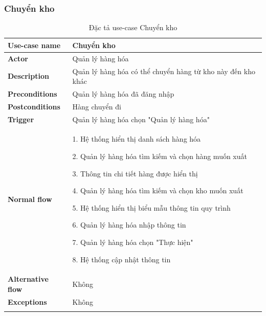 \subsubsection{Chuyển kho}
{
    \setlength\extrarowheight{6pt}
    \begin{longtable}{| p{} | p{} |}
        \hline
        \textbf{Use-case name}
         &
        Chuyển kho
        \\
        \hline
        \textbf{Actor}
         &
        Quản lý hàng hóa
        \\
        \hline
        \textbf{Description}
         &
        Quản lý hàng hóa có thể chuyển hàng từ kho này đến kho khác
        \\
        \hline
        \textbf{Preconditions}
         &
        Quản lý hàng hóa đã đăng nhập
        \\
        \hline
        \textbf{Postconditions}
         &
        Hàng chuyển đi
        \\
        \hline
        \textbf{Trigger}
         &
        Quản lý hàng hóa chọn "Quản lý hàng hóa"
        \\
        \hline
        \begin{flushleft}
            \textbf{Normal flow}
        \end{flushleft}
         &
        1. Hệ thống hiển thị danh sách hàng hóa

        2. Quản lý hàng hóa tìm kiếm và chọn hàng muốn xuất

        3. Thông tin chi tiết hàng được hiển thị

        4. Quản lý hàng hóa tìm kiếm và chọn kho muốn xuất

        5. Hệ thống hiển thị biểu mẫu thông tin quy trình

        6. Quản lý hàng hóa nhập thông tin

        7. Quản lý hàng hóa chọn "Thực hiện"

        8. Hệ thống cập nhật thông tin
        \\
        \hline
        \textbf{Alternative flow}
         &
        Không
        \\
        \hline
        \textbf{Exceptions}
         &
        Không
        \\
        \hline
        \caption{Đặc tả use-case Chuyển kho}
    \end{longtable}
}

